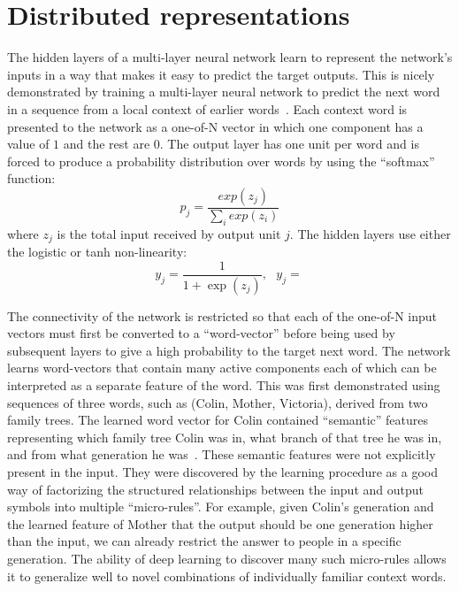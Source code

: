 \documentclass[]{article}
\begin{document}
\section{Distributed representations}

The hidden layers of a multi-layer neural network learn to represent the
network's inputs in a way that makes it easy to predict the target
outputs. This is nicely demonstrated by training a multi-layer neural
network to predict the next word in a sequence from a local context of
earlier words~\citep{BenDucVin01-short}. 
Each context word is presented to the network as a one-of-N
vector in which one component has a value of $1$ and the rest are $0$. The
output layer has one unit per word and is forced to produce a probability
distribution over words by using the ``softmax'' function:
\begin{equation}
p_j = \frac{exp(z_j)}{\sum_i exp(z_i)}
\end{equation}
where $z_j$ is the total input received by output unit $j$. The hidden
layers use either the logistic or tanh non-linearity:
\begin{equation}
y_j = \frac{1}{1+ \exp(z_j)}, \ \ \ y_j = \frac{}{} %
\end{equation}

The connectivity of the network is restricted so that each of the one-of-N
input vectors must first be converted to a ``word-vector'' before being
used by subsequent layers to give a high probability to the target next
word.  The network learns word-vectors that contain many active components
each of which can be interpreted as a separate feature of the word. This
was first demonstrated\cite{RHW} using sequences of three words, such as
(Colin, Mother, Victoria), derived from two family trees. The learned word
vector for Colin contained ``semantic'' features representing which family
tree Colin was in, what branch of that tree he was in, and from what generation
he was~\cite{Hinton-et-al-PDP1986}. These semantic features were not explicitly present
in the input.  They were discovered by the learning procedure as a good way
of factorizing the structured relationships between the input and output
symbols into multiple ``micro-rules''.  For example, given Colin's
generation and the learned feature of Mother that the output should be one
generation higher than the input, we can already restrict the answer to
people in a specific generation. The ability of deep learning to discover
many such micro-rules allows it to generalize well to novel combinations of
individually familiar context words.
\end{document}
